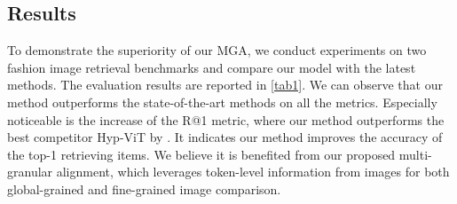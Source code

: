 \documentclass[10pt,twocolumn,letterpaper]{article}
\begin{document}
\subsection{Results}

To demonstrate the superiority of our MGA, we conduct experiments on two fashion image retrieval benchmarks and compare our model with the latest methods. The evaluation results are reported in \cref{tab1}. We can observe that our method outperforms the state-of-the-art methods on all the metrics. Especially noticeable is the increase of the R@1 metric, where our method outperforms the best competitor Hyp-ViT by . It indicates our method improves the accuracy of the top-1 retrieving items. We believe it is benefited from our proposed multi-granular alignment, which leverages token-level information from images for both global-grained and fine-grained image comparison. 
\end{document}
